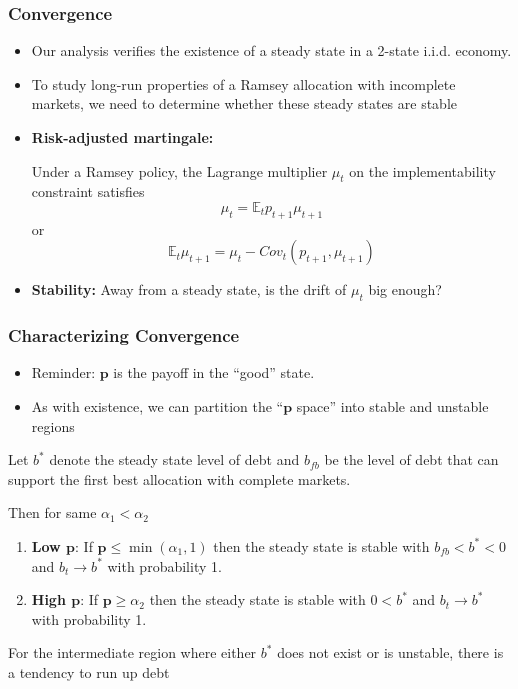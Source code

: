 \documentclass{beamer}
\newcommand{\EE}{\mathbb E}
\begin{document}
 \begin{frame}
  \frametitle{Convergence}
  \begin{itemize}
		\item Our analysis verifies the existence of a steady state in a 2-state i.i.d. economy.
		\item To study long-run properties of a Ramsey allocation with incomplete markets, we need to determine whether these steady states are stable
		\item \textbf{Risk-adjusted martingale:}
		
		Under a Ramsey policy, the Lagrange multiplier $\mu_t$ on the implementability  constraint   satisfies
		\[
			\mu_t = \EE_t p_{t+1} \mu_{t+1}
		\] or
		\[
		\EE_t  \mu_{t+1}	= \mu_t -Cov_t (p_{t+1}, \mu_{t+1})
		\]
	
		\item \textbf{Stability: }   Away from a steady state, is the drift  of $\mu_t$ big enough?
		\end{itemize}
	

  \end{frame}

  \begin{frame}
  \frametitle{Characterizing Convergence}

  \begin{itemize}
  \item Reminder:  $\bm{p}$ is the payoff in the ``good'' state.
   \item As with existence, we can partition  the ``$\bm{p}$ space'' into stable and unstable regions
     \end{itemize}

 	\begin{theorem}
Let $b^*$ denote the steady state level of debt and $b_{fb}$ be the level of debt that can support the first best allocation with complete markets.

Then for  same $  \alpha_1 < \alpha_2$
		\begin{enumerate}
			\item  \textbf{Low $\bm{p}$}: If $\bm{p}\leq\min(\alpha_1,1)$ then the steady state is stable with $b_{fb}<b^*<0$ and $b_t\rightarrow b^*$ with probability 1.
			\item \textbf{High  $\bm{p}$}:  If $\bm{p} \geq \alpha_2$ then the steady state is stable with $0<b^*$ and $b_t \rightarrow b^*$ with probability 1.
			
			
			\end{enumerate}
			\end{theorem}
			
			For the intermediate region where either $b^*$ does not exist or is unstable, there is a tendency to run up debt
		
		
	
 \end{frame}
\end{document}

